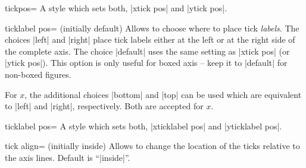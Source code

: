 \begin{pgfplotskey}{tickpos=}
	A style which sets both, |xtick pos| and |ytick pos|.
\end{pgfplotskey}

\begin{pgfplotsxykey}{\x ticklabel pos= (initially default)}
Allows to choose where to place tick \emph{labels}. The choices |left| and |right| place tick labels either at the left or at the right side of the complete axis. The choice |default| uses the same setting as |xtick pos| (or |ytick pos|). This option is only useful for boxed axis -- keep it to |default| for non-boxed figures.

For $x$, the additional choices |bottom| and |top| can be used which are equivalent to |left| and |right|, respectively. Both are accepted for $x$.
\end{pgfplotsxykey}

\begin{pgfplotskey}{ticklabel pos=}
	A style which sets both, |xticklabel pos| and |yticklabel pos|.
\end{pgfplotskey}

\begin{pgfplotsxykey}{\x tick align= (initially inside)}
Allows to change the location of the ticks relative to the axis lines.
Default is ``|inside|''.
\begin{codeexample}[]
\end{codeexample}

\begin{codeexample}[]
\end{codeexample}

\begin{codeexample}[]
\end{codeexample}
\end{pgfplotsxykey}

